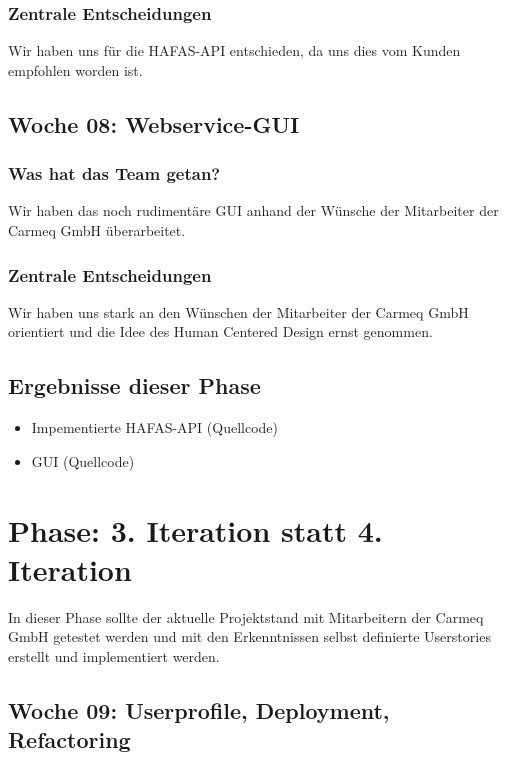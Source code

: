 \documentclass{article}
\begin{document}
\subsubsection{Zentrale Entscheidungen}

Wir haben uns f\"ur die HAFAS-API entschieden, da uns dies vom Kunden empfohlen worden ist.

\subsection{Woche 08: Webservice-GUI}

\subsubsection{Was hat das Team getan?}

Wir haben das noch rudiment\"are GUI anhand der W\"unsche der Mitarbeiter der Carmeq GmbH \"uberarbeitet.

\subsubsection{Zentrale Entscheidungen}

Wir haben uns stark an den W\"unschen der Mitarbeiter der Carmeq GmbH orientiert und die Idee des Human Centered Design ernst genommen.

\subsection{Ergebnisse dieser Phase}

\begin{itemize}
\item Impementierte HAFAS-API (Quellcode)
\item GUI (Quellcode)
\end{itemize}


\section{Phase: 3. Iteration statt 4. Iteration}

In dieser Phase sollte der aktuelle Projektstand mit Mitarbeitern der Carmeq GmbH getestet werden und mit den Erkenntnissen selbst definierte Userstories erstellt und implementiert werden.

\subsection{Woche 09: Userprofile, Deployment, Refactoring}
\end{document}

